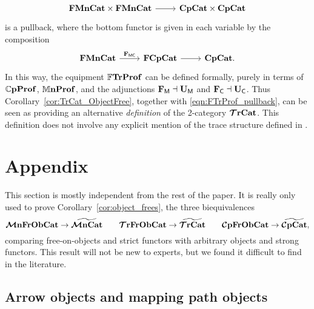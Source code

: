 \documentclass[11pt,oneside,article]{memoir}
\begin{document}
\begin{remark}
\begin{equation}
\begin{tikzcd}
      \FrMonCat\times\FrMonCat \ar[r]
         & \CompCat\times\CompCat
   \end{tikzcd} \end{equation}
   is a pullback, where the bottom functor is given in each variable by the composition
   \[ \begin{tikzcd}
      \FrMonCat \ar[r,"\FMC"] & \FrCompCat \ar[r] & \CompCat.
   \end{tikzcd} \]
   In this way, the
   equipment $\mathbb{F}\mathbf{TrProf}$ can be defined formally, purely in terms of $\mathbb{C}\mathbf{pProf}$, $\mathbb{M}\mathbf{nProf}$, and
   the adjunctions $\mathbf{F}_{\mathsf{M}}\dashv\mathbf{U}_{\mathsf{M}}$ and $\mathbf{F}_{\mathsf{C}}\dashv\mathbf{U}_{\mathsf{C}}$. Thus Corollary~\ref{cor:TrCat_ObjectFree},
   together with \eqref{eqn:FTrProf_pullback}, can be seen as providing an alternative
   \emph{definition} of the 2-category $\bm{\mathcal{T}}\mathbf{rCat}$. This definition does not involve any explicit
   mention of the trace structure defined in \cite{JoyalStreetVerity}.
\end{remark}

\appendix
\chapter{Appendix}
      \label{appendix}

This section is mostly independent from the rest of the paper. It is really only used to prove
Corollary~\ref{cor:object_frees}, the three biequivalences
\[
   \bm{\mathcal{M}}\mathbf{nFrObCat} \to \widetilde{\bm{\mathcal{M}}\mathbf{nCat}} \qquad
   \bm{\mathcal{T}}\mathbf{rFrObCat} \to \widetilde{\bm{\mathcal{T}}\mathbf{rCat}} \qquad
   \bm{\mathcal{C}}\mathbf{pFrObCat} \to \widetilde{\bm{\mathcal{C}}\mathbf{pCat}},
\]
comparing free-on-objects and strict functors with arbitrary objects and strong functors. This
result will not be new to experts, but we found it difficult to find in the literature.

\section{Arrow objects and mapping path objects}
\end{document}
